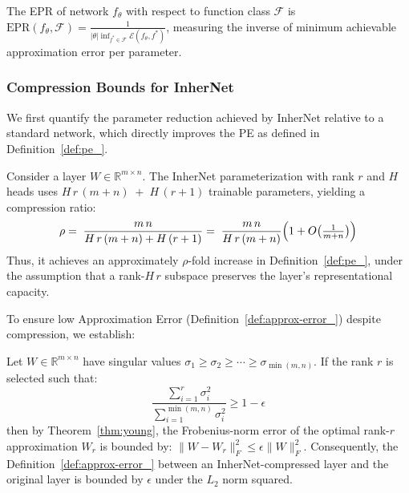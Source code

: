 \documentclass{article} %
\begin{document}
\begin{definition}\label{def:epr_}
The EPR of network $f_\theta$ with respect to function class $\mathcal{F}$ is 
$\text{EPR}(f_\theta, \mathcal{F}) = \frac{1}{|\theta|\inf_{f^* \in \mathcal{F}} \mathcal{E}(f_\theta, f^*)}$,
measuring the inverse of minimum achievable approximation error per parameter.
\end{definition}

\subsubsection{Compression Bounds for InherNet}

We first quantify the parameter reduction achieved by InherNet relative to a standard network, which directly improves the PE as defined in Definition~\ref{def:pe_}.

\begin{theorem}
\label{thm:reduction_}
Consider a layer \(W\in\mathbb R^{m\times n}\).  The InherNet parameterization with rank \(r\) and \(H\) heads uses $H\,r\,(m+n)\;+\;H\,(r+1)$ trainable parameters, yielding a compression ratio:
\begin{equation}
\rho
=\;
\frac{m\,n}
     {H\,r\,(m+n) + H\,(r+1)}
=\;
\frac{m\,n}
     {H\,r\,(m+n)}
\Bigl(1+O\bigl(\tfrac1{m+n}\bigr)\Bigr)
\end{equation}
Thus, it achieves an approximately \(\rho\)-fold increase in Definition~\ref{def:pe_}, under the assumption that a rank-\(H\,r\) subspace preserves the layer's representational capacity.
\end{theorem}

To ensure low Approximation Error (Definition~\ref{def:approx-error_}) despite compression, we establish:

\begin{lemma}\label{lem:spectral_}
Let $W \in \mathbb{R}^{m \times n}$ have singular values $\sigma_1 \ge \sigma_2 \ge \cdots \ge \sigma_{\min(m,n)}$. If the rank $r$ is selected such that:
\begin{equation}
\frac{\sum_{i=1}^{r} \sigma_i^2}{\sum_{i=1}^{\min(m,n)} \sigma_i^2} \ge 1 - \epsilon
\end{equation}
then by Theorem~\ref{thm:young}, the Frobenius-norm error of the optimal rank-$r$ approximation $W_r$ is bounded by: \(\|W - W_r\|_F^2 \leq \epsilon\|W\|_F^2\).
Consequently, the Definition~\ref{def:approx-error_} between an InherNet-compressed layer and the original layer is bounded by $\epsilon$ under the $L_2$ norm squared.
\end{lemma}
\end{document}
